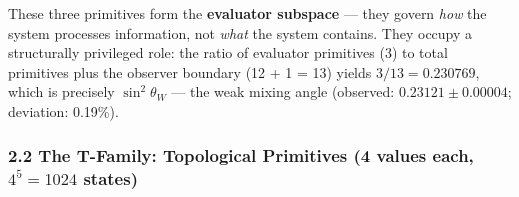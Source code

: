 \documentclass[12pt,a4paper]{article}
\begin{document}
These three primitives form the \textbf{evaluator subspace} --- they
govern \emph{how} the system processes information, not \emph{what} the
system contains. They occupy a structurally privileged role: the ratio
of evaluator primitives (3) to total primitives plus the observer
boundary (12 + 1 = 13) yields \(3/13 = 0.230769\), which is precisely
\(\sin^2\theta_W\) --- the weak mixing angle (observed:
\(0.23121 \pm 0.00004\); deviation: 0.19\%).

\hypertarget{the-t-family-topological-primitives-4-values-each-45-1024-states}{%
\subsubsection{\texorpdfstring{2.2 The T-Family: Topological Primitives
(4 values each, \(4^5 = 1024\)
states)}{2.2 The T-Family: Topological Primitives (4 values each, 4\^{}5 = 1024 states)}}\label{the-t-family-topological-primitives-4-values-each-45-1024-states}}
\end{document}
